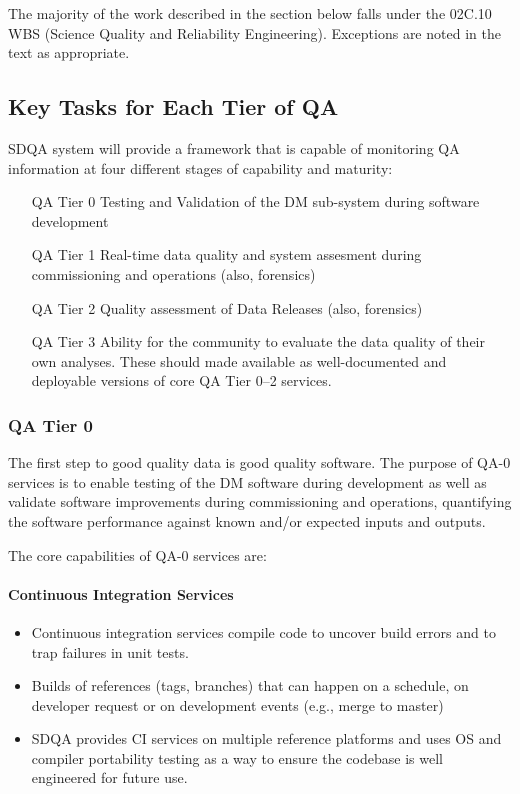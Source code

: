 The majority of the work described in the section below falls under the 02C.10 WBS (Science Quality and Reliability Engineering). Exceptions are noted in the text as appropriate.

\subsection{Key Tasks for Each Tier of QA}

SDQA system will provide a framework that is capable of monitoring QA information at four different stages of capability and maturity:

\begin{itemize}
\item[QA Tier 0] Testing and Validation of the DM sub-system during software development
\item[QA Tier 1] Real-time data quality and system assesment during commissioning and operations (also, forensics)
\item[QA Tier 2] Quality assessment of Data Releases (also, forensics)
\item[QA Tier 3] Ability for the community to evaluate the data quality of their own analyses. These should made available as well-documented and deployable versions of core QA Tier 0--2 services.
\end{itemize}

\subsubsection{QA Tier 0}

The first step to good quality data is good quality software. The purpose of QA-0 services is to enable testing of the DM software during development as well as validate software improvements during commissioning and operations, quantifying the software performance against known and/or expected inputs and outputs.

The core capabilities of QA-0 services are:

\paragraph{Continuous Integration Services}
\label{sec:qaCI}
\begin{itemize}

\item Continuous integration services compile code to uncover build errors and to trap failures in unit tests.

\item Builds of references (tags, branches) that can happen on a schedule, on developer request or on development events (e.g.,  merge to master)

\item SDQA provides CI services on multiple reference platforms and uses OS and compiler portability testing as a way to ensure the codebase is well engineered for future use.

\end{itemize}

